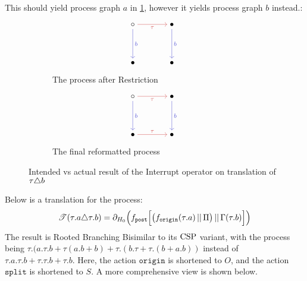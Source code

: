 \documentclass[../hons_project.tex]{subfiles}
\begin{document}
\newpage
This should yield process graph $a$ in \cref{fig:interrupt-c}, however it yields process graph $b$ instead.:
\begin{multicols}{2}

\end{multicols}

\begin{figure}[!ht]
	\centering
	\begin{subfigure}[b]{0.45\textwidth}
		\[\begin{tikzcd}[cramped, column sep=scriptsize]
				\circ && \bullet \\
				\\
				\bullet && \bullet
				\arrow["\tau"', color={rgb,255:red,214;green,92;blue,92}, from=1-1, to=1-3]
				\arrow["b", color={rgb,255:red,92;green,92;blue,214}, from=1-1, to=3-1]
				\arrow["b", color={rgb,255:red,92;green,92;blue,214}, from=1-3, to=3-3]
			\end{tikzcd}\]
		\caption{The process after Restriction}
	\end{subfigure}\hfill
	\begin{subfigure}[b]{0.45\textwidth}
		\[\begin{tikzcd}[cramped, column sep=scriptsize]
				\circ && \bullet \\
				\\
				\bullet && \bullet
				\arrow["\tau"', color={rgb,255:red,214;green,92;blue,92}, from=1-1, to=1-3]
				\arrow["b", color={rgb,255:red,92;green,92;blue,214}, from=1-1, to=3-1]
				\arrow["b", color={rgb,255:red,92;green,92;blue,214}, from=1-3, to=3-3]
				\arrow["\tau", color={rgb,255:red,214;green,92;blue,92}, from=3-1, to=3-3]
			\end{tikzcd}\]
		\caption{The final reformatted process}
	\end{subfigure}
	\caption{Intended vs actual result of the Interrupt operator on translation of $\tau \triangle b$}
	\label{fig:interrupt-c}
\end{figure}

Below is a translation for the process:
\[\mathscr{T}(\tau.a \triangle \tau.b) = \partial_{H_{0}}\Bigl(f_{\mathtt{post}}\Bigl[ \bigl(f_{\mathtt{origin}}(\tau.a) \,\vert\vert\, \Pi\bigr) \,\vert\vert\, \Gamma(\tau.b) \Bigr]\Bigr)\]
The result is Rooted Branching Bisimilar to its $\mathrm{CSP}$ variant, with the process being $\tau.(a.\tau.b + \tau(a.b+b) + \tau.(b.\tau + \tau.(b + a.b))$ instead of $\tau.a.\tau.b + \tau.\tau.b + \tau.b$. Here, the action $\mathtt{origin}$ is shortened to $O$, and the action $\mathtt{split}$ is shortened to $S$. A more comprehensive view is shown below.
\end{document}
